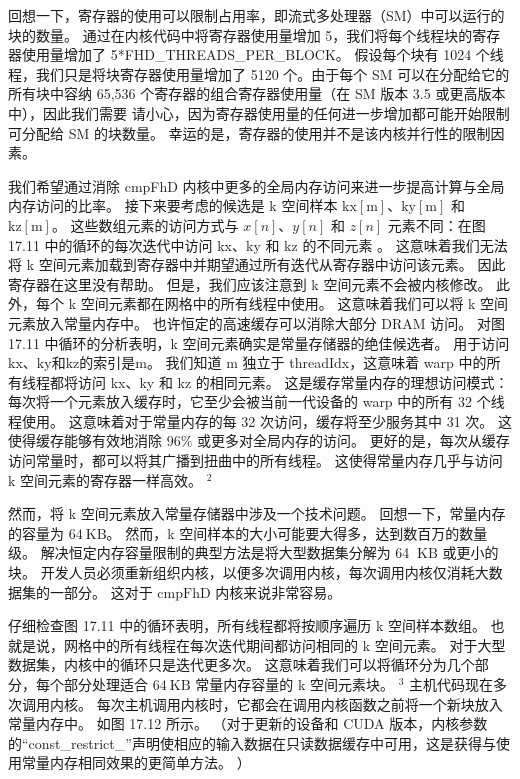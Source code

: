 回想一下，寄存器的使用可以限制占用率，即流式多处理器（SM）中可以运行的块的数量。 通过在内核代码中将寄存器使用量增加 5，我们将每个线程块的寄存器使用量增加了 5*FHD\_THREADS\_PER\_BLOCK。 假设每个块有 1024 个线程，我们只是将块寄存器使用量增加了 5120 个。由于每个 SM 可以在分配给它的所有块中容纳 65,536 个寄存器的组合寄存器使用量（在 SM 版本 3.5 或更高版本中），因此我们需要 请小心，因为寄存器使用量的任何进一步增加都可能开始限制可分配给 SM 的块数量。 幸运的是，寄存器的使用并不是该内核并行性的限制因素。

我们希望通过消除 cmpFhD 内核中更多的全局内存访问来进一步提高计算与全局内存访问的比率。 接下来要考虑的候选是 $\mathrm{k}$ 空间样本 $\mathrm{kx}[\mathrm{m}]、\mathrm{ky}[\mathrm{m}]$ 和 $\mathrm{ kz}[\mathrm{m}]$。 这些数组元素的访问方式与 $x[n]、y[n]$ 和 $z[n]$ 元素不同：在图 17.11 中的循环的每次迭代中访问 kx、ky 和 kz 的不同元素 。 这意味着我们无法将 k 空间元素加载到寄存器中并期望通过所有迭代从寄存器中访问该元素。 因此寄存器在这里没有帮助。 但是，我们应该注意到 k 空间元素不会被内核修改。 此外，每个 k 空间元素都在网格中的所有线程中使用。 这意味着我们可以将 k 空间元素放入常量内存中。 也许恒定的高速缓存可以消除大部分 DRAM 访问。 对图 17.11 中循环的分析表明，k 空间元素确实是常量存储器的绝佳候选者。 用于访问$\mathrm{kx}、\mathrm{ky}$和$\mathrm{kz}$的索引是$\mathrm{m}$。 我们知道 $\mathrm{m}$ 独立于 threadIdx，这意味着 warp 中的所有线程都将访问 kx、ky 和 kz 的相同元素。 这是缓存常量内存的理想访问模式：每次将一个元素放入缓存时，它至少会被当前一代设备的 warp 中的所有 32 个线程使用。 这意味着对于常量内存的每 32 次访问，缓存将至少服务其中 31 次。 这使得缓存能够有效地消除 $96 \%$ 或更多对全局内存的访问。 更好的是，每次从缓存访问常量时，都可以将其广播到扭曲中的所有线程。 这使得常量内存几乎与访问 $\mathrm{k}$ 空间元素的寄存器一样高效。 ${}^{2}$

然而，将 k 空间元素放入常量存储器中涉及一个技术问题。 回想一下，常量内存的容量为 $64 \mathrm{~KB}$。 然而，k 空间样本的大小可能要大得多，达到数百万的数量级。 解决恒定内存容量限制的典型方法是将大型数据集分解为 64 $\mathrm{~KB}$ 或更小的块。 开发人员必须重新组织内核，以便多次调用内核，每次调用内核仅消耗大数据集的一部分。 这对于 $\mathrm{cmpFhD}$ 内核来说非常容易。

仔细检查图 17.11 中的循环表明，所有线程都将按顺序遍历 k 空间样本数组。 也就是说，网格中的所有线程在每次迭代期间都访问相同的 k 空间元素。 对于大型数据集，内核中的循环只是迭代更多次。 这意味着我们可以将循环分为几个部分，每个部分处理适合 $64 \mathrm{~KB}$ 常量内存容量的 k 空间元素块。 ${ }^{3}$ 主机代码现在多次调用内核。 每次主机调用内核时，它都会在调用内核函数之前将一个新块放入常量内存中。 如图 17.12 所示。 （对于更新的设备和 CUDA 版本，内核参数的“const\_restrict\_”声明使相应的输入数据在只读数据缓存中可用，这是获得与使用常量内存相同效果的更简单方法。 ）

